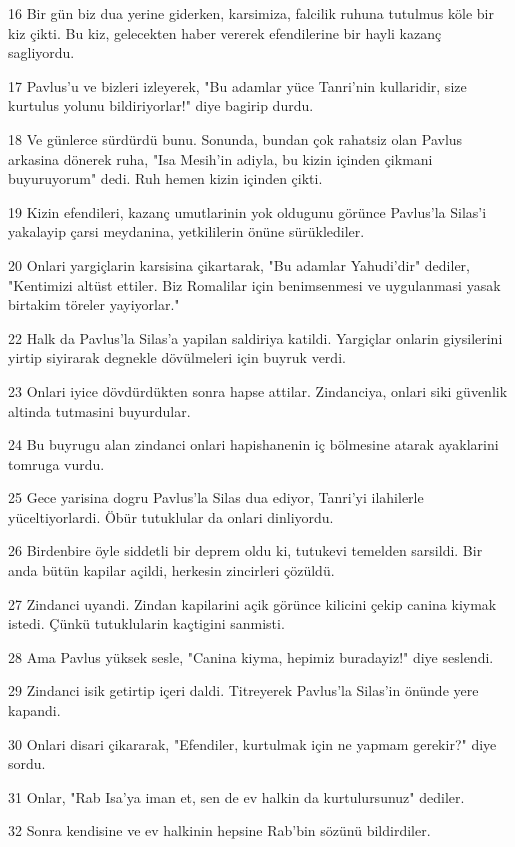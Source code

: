 \par 16 Bir gün biz dua yerine giderken, karsimiza, falcilik ruhuna tutulmus köle bir kiz çikti. Bu kiz, gelecekten haber vererek efendilerine bir hayli kazanç sagliyordu.
\par 17 Pavlus'u ve bizleri izleyerek, "Bu adamlar yüce Tanri'nin kullaridir, size kurtulus yolunu bildiriyorlar!" diye bagirip durdu.
\par 18 Ve günlerce sürdürdü bunu. Sonunda, bundan çok rahatsiz olan Pavlus arkasina dönerek ruha, "Isa Mesih'in adiyla, bu kizin içinden çikmani buyuruyorum" dedi. Ruh hemen kizin içinden çikti.
\par 19 Kizin efendileri, kazanç umutlarinin yok oldugunu görünce Pavlus'la Silas'i yakalayip çarsi meydanina, yetkililerin önüne sürüklediler.
\par 20 Onlari yargiçlarin karsisina çikartarak, "Bu adamlar Yahudi'dir" dediler, "Kentimizi altüst ettiler. Biz Romalilar için benimsenmesi ve uygulanmasi yasak birtakim töreler yayiyorlar."
\par 22 Halk da Pavlus'la Silas'a yapilan saldiriya katildi. Yargiçlar onlarin giysilerini yirtip siyirarak degnekle dövülmeleri için buyruk verdi.
\par 23 Onlari iyice dövdürdükten sonra hapse attilar. Zindanciya, onlari siki güvenlik altinda tutmasini buyurdular.
\par 24 Bu buyrugu alan zindanci onlari hapishanenin iç bölmesine atarak ayaklarini tomruga vurdu.
\par 25 Gece yarisina dogru Pavlus'la Silas dua ediyor, Tanri'yi ilahilerle yüceltiyorlardi. Öbür tutuklular da onlari dinliyordu.
\par 26 Birdenbire öyle siddetli bir deprem oldu ki, tutukevi temelden sarsildi. Bir anda bütün kapilar açildi, herkesin zincirleri çözüldü.
\par 27 Zindanci uyandi. Zindan kapilarini açik görünce kilicini çekip canina kiymak istedi. Çünkü tutuklularin kaçtigini sanmisti.
\par 28 Ama Pavlus yüksek sesle, "Canina kiyma, hepimiz buradayiz!" diye seslendi.
\par 29 Zindanci isik getirtip içeri daldi. Titreyerek Pavlus'la Silas'in önünde yere kapandi.
\par 30 Onlari disari çikararak, "Efendiler, kurtulmak için ne yapmam gerekir?" diye sordu.
\par 31 Onlar, "Rab Isa'ya iman et, sen de ev halkin da kurtulursunuz" dediler.
\par 32 Sonra kendisine ve ev halkinin hepsine Rab'bin sözünü bildirdiler.
